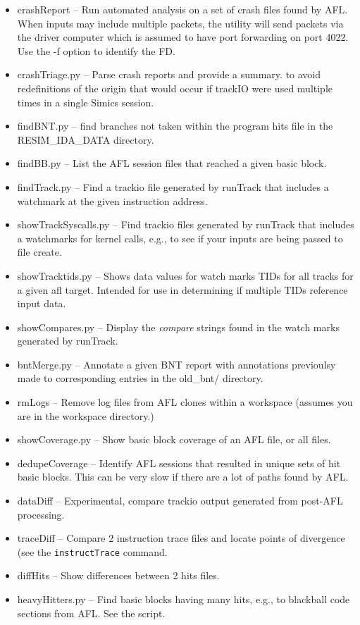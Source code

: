 \documentclass[titlepage]{article}
\begin{document}
\begin{itemize}
\item crashReport -- Run automated analysis on a set of crash files found by AFL.  When inputs may include multiple packets, the utility
will send packets via the driver computer which is assumed to have port forwarding on port 4022.   Use the -f option
to identify the FD.
\item crashTriage.py -- Parse crash reports and provide a summary.
to avoid redefinitions of the origin that would occur if trackIO were used multiple times in a single Simics session.
\item findBNT.py -- find branches not taken within the program hits file in the RESIM\_IDA\_DATA directory.
\item findBB.py -- List the AFL session files that reached a given basic block.
\item findTrack.py -- Find a trackio file generated by runTrack that includes a watchmark at the given instruction address.
\item showTrackSyscalls.py -- Find trackio files generated by runTrack that includes a watchmarks for kernel calls, e.g., to see if your inputs are being passed to file create.
\item showTracktids.py -- Shows data values for watch marks TIDs for all tracks for a given afl target.
Intended for use in determining if multiple TIDs reference input data.
\item showCompares.py -- Display the \textit{compare} strings found in the watch marks generated by runTrack.
\item bntMerge.py -- Annotate a given BNT report with annotations previoulsy made to corresponding entries in the old\_bnt/ directory.
\item rmLogs -- Remove log files from AFL clones within a workspace (assumes you are in the workspace directory.)
\item showCoverage.py -- Show basic block coverage of an AFL file, or all files.
\item dedupeCoverage -- Identify AFL sessions that resulted in unique sets of hit basic blocks. This can be very slow if there are a lot of paths found by AFL.
\item dataDiff -- Experimental, compare trackio output generated from post-AFL processing.
\item traceDiff -- Compare 2 instruction trace files and locate points of divergence (see the {\tt instructTrace} command.
\item diffHits -- Show differences between 2 hits files.
\item heavyHitters.py -- Find basic blocks having many hits, e.g., to blackball code sections from AFL.  See the script.

\end{itemize}
\end{document}
